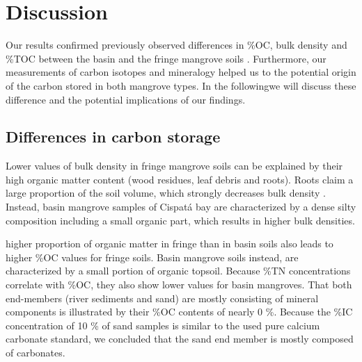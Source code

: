 \section{Discussion}
Our results confirmed previously observed differences in \%OC, bulk density and \%TOC between the basin and the fringe mangrove soils \citep{Bolivar2015}.  Furthermore, our measurements of carbon isotopes and mineralogy helped us to \DIFdelbegin {}\DIFdelend \DIFaddbegin {}\DIFaddend the potential origin of the carbon stored in both mangrove types. In the following\DIFaddbegin \DIFadd{, }\DIFaddend we will discuss these difference and the potential implications of our findings. 

\subsection{Differences in carbon storage}
Lower values of bulk density in fringe mangrove soils can be explained by their high organic matter content (wood residues, leaf debris and roots). Roots claim a large proportion of the soil volume, which strongly decreases bulk density \DIFaddbegin {}\DIFaddend . Instead, basin mangrove samples of Cispat\'{a} bay are characterized by a dense silty composition including a small organic part, which results in higher bulk densities. \DIFdelbegin {}%
\DIFdelend %
\DIFaddbegin 

\DIFaddend higher proportion of organic matter in fringe than in basin soils also leads to higher \%OC values for fringe soils. Basin mangrove soils instead, are characterized by a small portion of organic topsoil. Because \%TN concentrations correlate with \%OC, they also show lower values for basin mangroves. That both end-members (river sediments and sand) are mostly consisting of mineral components is illustrated by their \%OC contents of nearly 0 \%. Because the \%IC concentration of 10 \% of sand samples is similar to the used pure calcium carbonate standard, we concluded that the sand end member is mostly composed of carbonates.

